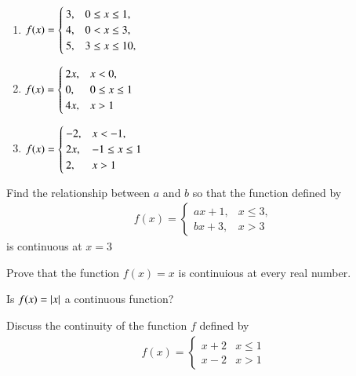 \begin{enumerate}
\item 
$
\begin{alignedat}[t]{2}
f(x)=
\begin{cases}
3, & 0 \le x \le 1,
\\
4, & 0 < x \le 3,
\\
5, & 3 \le x \le 10,
\end{cases}
\end{alignedat}
$
%
\item 
$
\begin{alignedat}[t]{2}
f(x)=
\begin{cases}
2x, & x < 0,
\\
0, & 0 \le x \le 1
\\
4x, &  x > 1
\end{cases}
\end{alignedat}
$
\item 
$
\begin{alignedat}[t]{2}
f(x)=
\begin{cases}
-2, & x < -1,
\\
2x, & -1 \le x \le  1
\\
2, & x >  1
\end{cases}
\end{alignedat}
$
\end{enumerate}
%
\item Find the relationship between $a$ and $b$ so that the function defined by 	
%
\begin{align}
f(x)=
\begin{cases}
ax+1, & x \le 3,
\\
bx+3, & x > 3
\end{cases}
\end{align}
%
is continuous at $x = 3$
%
\item Prove that the function $f(x) = x$ is continuious at every real number.
\item Is $f(x) = \left\vert x\right\vert$ a continuous function?
\item Discuss the continuity of the function $f$ defined by 
%
\begin{align}
f(x)  = 
\begin{cases}
x+2 & x \le 1
\\
x-2 & x > 1
\end{cases}
\end{align}

